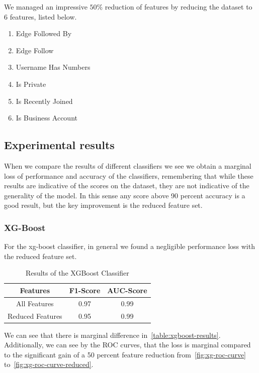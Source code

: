 \documentclass[conference]{IEEEtran}
\begin{document}
We managed an impressive $50\%$ reduction of features by reducing the dataset to 6 features, listed below.

\begin{enumerate}
\item Edge Followed By
\item Edge Follow
\item Username Has Numbers
\item Is Private
\item Is Recently Joined
\item Is Business Account
\end{enumerate}

\subsection{Experimental results}

When we compare the results of different classifiers we see we obtain a marginal loss of performance and accuracy of the classifiers, remembering that while these results are indicative of the scores on the dataset, they are not indicative of the generality of the model. In this sense any score above 90 percent accuracy is a good result, but the key improvement is the reduced feature set.

\subsubsection{XG-Boost}

For the xg-boost classifier, in general we found a negligible performance loss with the reduced feature set.

\begin{table}[h!]
    \begin{center}
	\begin{tabular}{| c | c c |}
		\hline
		Features & F1-Score & AUC-Score\\ [0.5ex]
		\hline
		All Features & 0.97 & 0.99    \\
		Reduced Features & 0.95 & 0.99     \\[1ex]
		\hline
	\end{tabular}
\end{center}
	\caption{Results of the XGBoost Classifier}
	\label{table:xgboost-results}
\end{table}

We can see that there is marginal difference in~\autoref{table:xgboost-results}. Additionally, we can see by the ROC curves, that the loss is marginal compared to the significant gain of a 50 percent feature reduction from~\autoref{fig:xg-roc-curve} to~\autoref{fig:xg-roc-curve-reduced}.
\end{document}
